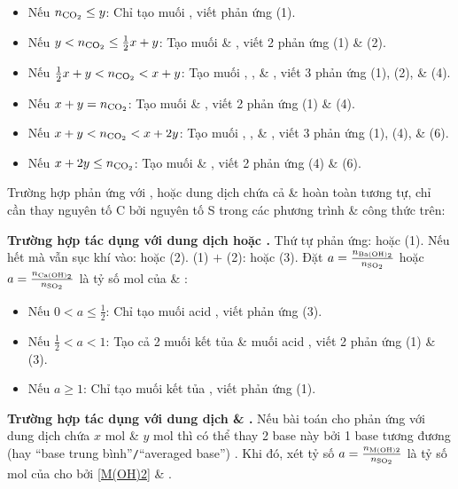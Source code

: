 \documentclass{article}
\begin{document}
\begin{itemize}
	\item Nếu $n_{\ce{CO2}}\le y$: Chỉ tạo muối , viết phản ứng (1).
	\item Nếu $y < n_{\ce{CO2}}\le\frac{1}{2}x + y$: Tạo muối  \& , viết 2 phản ứng (1) \& (2).
	\item Nếu $\frac{1}{2}x + y < n_{\ce{CO2}} < x + y$: Tạo muối , , \& , viết 3 phản ứng (1), (2), \& (4).
	\item Nếu $x + y = n_{\ce{CO2}}$: Tạo muối  \& , viết 2 phản ứng (1) \& (4).
	\item Nếu $x + y < n_{\ce{CO2}} < x + 2y$: Tạo muối , , \& , viết 3 phản ứng (1), (4), \& (6).
	\item Nếu $x + 2y\le n_{\ce{CO2}}$: Tạo muối  \& , viết 2 phản ứng (4) \& (6).
\end{itemize}




Trường hợp  phản ứng với , hoặc dung dịch chứa cả  \&  hoàn toàn tương tự, chỉ cần thay nguyên tố C bởi nguyên tố S trong các phương trình \& công thức trên:
\vspace{2mm}

\textbf{\textsf{Trường hợp  tác dụng với dung dịch  hoặc .}} Thứ tự phản ứng:  hoặc  (1). Nếu  hết mà vẫn sục khí  vào:  hoặc  (2). (1) $+$ (2):  hoặc  (3). Đặt $a = \frac{n_{\ce{Ba(OH)2}}}{n_{\ce{SO2}}}$ hoặc $a = \frac{n_{\ce{Ca(OH)2}}}{n_{\ce{SO2}}}$ là tỷ số mol của  \& :
\begin{itemize}
	\item Nếu $0 < a\le\frac{1}{2}$: Chỉ tạo muối acid , viết phản ứng (3).
	\item Nếu $\frac{1}{2} < a < 1$: Tạo cả 2 muối kết tủa  \& muối acid , viết 2 phản ứng (1) \& (3).
	\item Nếu $a\ge1$: Chỉ tạo muối kết tủa , viết phản ứng (1).
\end{itemize}
\textbf{\textsf{Trường hợp  tác dụng với dung dịch  \& .}} Nếu bài toán cho  phản ứng với dung dịch chứa $x$ mol  \& $y$ mol  thì có thể thay 2 base này bởi 1 base tương đương (hay ``base trung bình''{\tt/}``averaged base'') . Khi đó, xét tỷ số $a = \frac{n_{\rm M(OH)2}}{n_{\ce{SO2}}}$ là tỷ số mol của  cho bởi \eqref{M(OH)2} \& .
\vspace{2mm}
\end{document}
